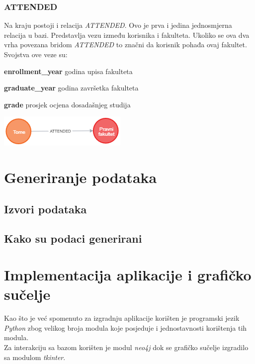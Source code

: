 \documentclass[titlepage, 12pt]{scrartcl}
\begin{document}
\subsubsection{ATTENDED}
Na kraju postoji i relacija \emph{ATTENDED}. Ovo je prva i jedina jednosmjerna relacija u bazi. Predstavlja vezu između korisnika i fakulteta. Ukoliko se ova dva vrha povezana bridom \emph{ATTENDED} to značni da korisnik pohađa ovaj fakultet. \\
Svojstva ove veze su:
\begin{itemize}
\begin{samepage}
    \item \textbf{enrollment\_year} godina upisa fakulteta
    \item \textbf{graduate\_year} godina završetka fakulteta
    \item \textbf{grade} prosjek ocjena dosadašnjeg studija
\end{samepage}
\end{itemize}
\begin{center}
    \includegraphics{slike/ATTENDED.png}    
\end{center}

\newpage

\section{Generiranje podataka}
\subsection{Izvori podataka}
\subsection{Kako su podaci generirani}
\newpage

\section{Implementacija aplikacije i grafičko sučelje}
Kao što je već spomenuto za izgradnju aplikacije korišten je programski jezik \emph{Python} zbog velikog broja modula koje posjeduje i jednostavnosti korištenja tih modula. \\
Za interakciju sa bazom korišten je modul \emph{neo4j} dok se grafičko sučelje izgradilo sa modulom \emph{tkinter}.
\end{document}
